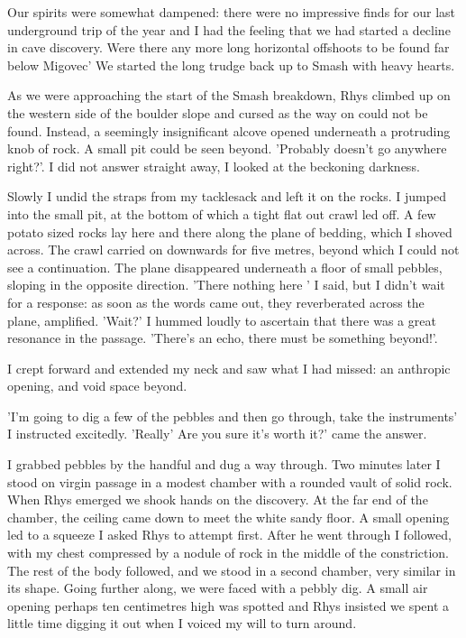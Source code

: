 \documentclass[onecolumn]{book}
\begin{document}
Our spirits were somewhat dampened: there were no impressive finds for our last underground trip of the year and I had the feeling that we had started a decline in cave discovery. Were there any more long horizontal offshoots to be found far below Migovec' We started the long trudge back up to Smash with heavy hearts.

As we were approaching the start of the Smash breakdown, Rhys climbed up on the western side of the boulder slope and cursed as the way on could not be found. Instead, a seemingly insignificant alcove opened underneath a protruding knob of rock. A small pit could be seen beyond. 'Probably doesn't go anywhere right?'. I did not answer straight away, I looked at the beckoning darkness.

Slowly I undid the straps from my tacklesack and left it on the rocks. I jumped into the small  pit, at the bottom of which a tight flat out crawl led off. A few potato sized rocks lay here and there along the plane of bedding, which I shoved across. The crawl carried on downwards for five metres, beyond which I could not see a continuation. The plane disappeared underneath a floor of small pebbles, sloping in the opposite direction. 'There nothing here ' I said, but I didn't wait for a response: as soon as the words came out, they reverberated across the plane, amplified. 'Wait?' I hummed loudly to ascertain that there was a great resonance in the passage. 'There's an echo, there must be something beyond!'.

I crept forward and extended my neck and saw what I had missed: an anthropic opening, and void space beyond. 

'I'm going to dig a few of the pebbles and then go through, take the instruments' I instructed excitedly. 
'Really' Are you sure it's worth it?' came the answer. 

I grabbed pebbles by the handful and dug a way through. Two minutes later I stood on virgin passage in a modest chamber with a rounded vault of solid rock. When Rhys emerged we shook hands on the discovery. At the far end of the chamber, the ceiling came down to meet the white sandy floor. A small opening led to a squeeze I asked Rhys to attempt first. After he went through I followed, with my chest compressed by a nodule of rock in the middle of the constriction. The rest of the body followed, and we stood in a second chamber, very similar in its shape. Going further along, we were faced with a pebbly dig. A small air opening perhaps ten centimetres high was spotted and Rhys insisted we spent a little time digging it out when I voiced my will to turn around. 
\end{document}
